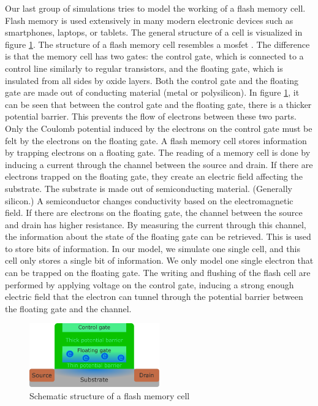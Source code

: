 Our last group of simulations tries to model the working of a flash memory cell.
Flash memory is used extensively in many modern electronic devices such as smartphones, laptops, or tablets.
The general structure of a cell is visualized in figure \ref{fig:flash_memory}.
The structure of a flash memory cell resembles a \acrfull{mosfet} \cite{Korec2011}.
The difference is that the memory cell has two gates: the control gate, which is connected to a control line similarly to regular transistors, and the floating gate, which is insulated from all sides by oxide layers.
Both the control gate and the floating gate are made out of conducting material (metal or polysilicon).
In figure \ref{fig:flash_memory}, it can be seen that between the control gate and the floating gate, there is a thicker potential barrier.
This prevents the flow of electrons between these two parts.
Only the Coulomb potential induced by the electrons on the control gate must be felt by the electrons on the floating gate.
A flash memory cell stores information by trapping electrons on a floating gate.
The reading of a memory cell is done by inducing a current through the channel between the source and drain.
If there are electrons trapped on the floating gate, they create an electric field affecting the substrate.
The substrate is made out of semiconducting material. (Generally silicon.)
A semiconductor changes conductivity based on the electromagnetic field.
If there are electrons on the floating gate, the channel between the source and drain has higher resistance.
By measuring the current through this channel, the information about the state of the floating gate can be retrieved.
This is used to store bits of information.
In our model, we simulate one single cell, and this cell only stores a single bit of information.
We only model one single electron that can be trapped on the floating gate.
The writing and flushing of the flash cell are performed by applying voltage on the control gate, inducing a strong enough electric field that the electron can tunnel through the potential barrier between the floating gate and the channel.
\begin{figure}[hbtp!]
	\centering
	\includegraphics[width=0.5\textwidth]{figures/flash_memory.pdf}
	\caption{Schematic structure of a flash memory cell}
	\label{fig:flash_memory}
\end{figure}
